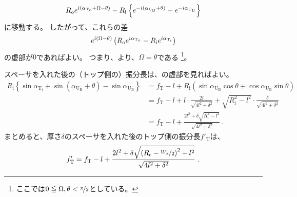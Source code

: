 \begin{align*}
  \notag
  R_\mathrm oe^{i(\alpha_{\mathrm T_\mathrm o} + \Omega - \theta)}
  -R_\mathrm i\left\{e^{-i(\alpha_{\mathrm U_\mathrm B} + \theta)}-e^{-i\alpha_{\mathrm U_\mathrm B}}\right\}
\end{align*}
に移動する。
したがって、これらの差
\begin{align*}
  \notag
  e^{i(\Omega - \theta)}\left(R_\mathrm oe^{i\alpha_{\mathrm T_\mathrm o}} - R_\mathrm ie^{i\alpha_{\mathrm T_\mathrm i}}\right)
\end{align*}
の虚部が$0$であればよい。
つまり、より、$\Omega = \theta$である
\footnote{ここでは$0 \leqq \Omega, \theta < \nicefrac \pi2$としている。}。

スペーサを入れた後の（トップ側の）振分長は、の虚部を見ればよい。
\begin{align*}
  R_\mathrm i\left\{\sin\alpha_{\mathrm T_\mathrm i} + \sin(\alpha_{\mathrm U_\mathrm B} + \theta) - \sin\alpha_{\mathrm U_\mathrm B}\right\}
  &= f_\mathrm T -l
     +R_\mathrm i\left(\sin\alpha_{\mathrm U_\mathrm B}\cos\theta + \cos\alpha_{\mathrm U_\mathrm B}\sin\theta\right)\\
  &= f_\mathrm T -l+l\cdot\frac{2l}{\sqrt{4l^2+\delta^2}}
     +\sqrt{R_\mathrm i^2-l^2}\cdot\frac{\delta}{\sqrt{4l^2+\delta^2}}\\
  &= f_\mathrm T -l+\frac{2l^2+\delta\sqrt{R_\mathrm i^2-l^2}}{\sqrt{4l^2+\delta^2}}~.
\end{align*}
まとめると、厚さ$\delta$のスペーサを入れた後のトップ側の振分長$f'_\mathrm T$は、
\begin{align*}
  f'_\mathrm T
  = f_\mathrm T -l
    +\frac{2l^2+\delta\sqrt{\left(R_\mathrm c-\nicefrac{W_x}2\right)^2-l^2}}{\sqrt{4l^2+\delta^2}}~.
\end{align*}



